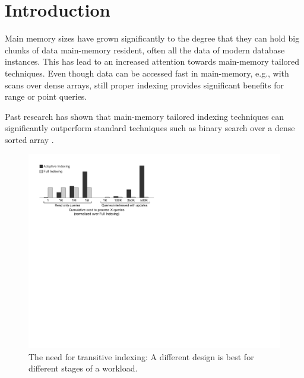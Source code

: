 \newpage
\section{Introduction}
\label{intro}

Main memory sizes have grown significantly to the degree that 
they can hold big chunks of data main-memory resident, often all the data of modern database instances.
This has lead to an increased attention towards main-memory tailored techniques.
Even though data can be accessed fast in main-memory, e.g., with scans over dense arrays, still 
proper indexing provides significant benefits for range or point queries.

Past research has shown that main-memory tailored indexing techniques can significantly outperform
standard techniques such as binary search over a dense sorted array \cite{cbbtrees,art}.


\begin{figure}[t]
\center
\includegraphics[width=0.85\columnwidth]{graphs/motivation.pdf}%
\caption{The need for transitive indexing: A different design is best for different stages of a workload.}
\label{F:Motivation}
\end{figure}


